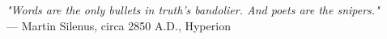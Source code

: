 \begin{flushright}
\emph{"Words are the only bullets in truth's bandolier. And poets are the snipers."}\\
--- Martin Silenus, circa 2850 A.D., Hyperion
\end{flushright}
